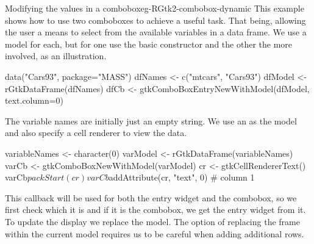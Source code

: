 \begin{example}{Modifying the values in a combobox}{eg-RGtk2-combobox-dynamic}
This example shows how to use two comboboxes to achieve a useful
task. That being, allowing the user a means to select from the
available variables in a data frame. We use a 
model for each, but for one use the basic constructor and the other
the more involved, as an illustration.
\begin{Schunk}
\begin{Sinput}
 data("Cars93", package="MASS")
 dfNames <- c("mtcars", "Cars93")
 dfModel <- rGtkDataFrame(dfNames)
 dfCb <- gtkComboBoxEntryNewWithModel(dfModel, text.column=0)
\end{Sinput}
\end{Schunk}

The variable names are initially just an empty string. We use an
  as the
model and also specify a cell renderer to view the data.

\begin{Schunk}
\begin{Sinput}
 variableNames <- character(0)
 varModel <- rGtkDataFrame(variableNames)
 varCb <- gtkComboBoxNewWithModel(varModel)
 cr <- gtkCellRendererText()
 varCb$packStart(cr)
 varCb$addAttribute(cr, "text", 0)       # column 1
\end{Sinput}
\end{Schunk}

This callback will be used for both the entry widget and the combobox,
so we first check which it is and if it is the combobox, we get the
entry widget from it. To update the display we replace the model. The
option of replacing the frame within the current model requires us to
be careful when adding additional rows.


\end{example}
